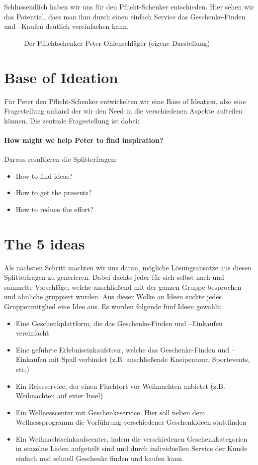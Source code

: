 \documentclass[12pt,ngerman, fleqn]{book} %
\begin{document}
Schlussendlich haben wir uns für den Pflicht-Schenker entschieden. Hier sehen wir das Potential, dass man ihm durch einen einfach Service das Geschenke-Finden und –Kaufen deutlich vereinfachen kann.

\begin{figure}[ht]
    \centering
    \caption{Der Pflichtschenker Peter Ohlenschläger (eigene Darstellung)}
    \label{fig:peter}
\end{figure}

\section{Base of Ideation}
Für Peter den Pflicht-Schenker entwickelten wir eine Base of Ideation, also eine Fragestellung anhand der wir den Need in die verschiedenen Aspekte aufteilen können. Die zentrale Fragestellung ist dabei:

\paragraph{How might we help Peter to find inspiration?}

Daraus resultieren die Splitterfragen:
\begin{itemize}
    \item How to find ideas?
    \item How to get the presents?
    \item How to reduce the effort?
\end{itemize}

\section{The 5 ideas}
Als nächsten Schritt machten wir uns daran, mögliche Lösungsansätze aus diesen Splitterfragen zu generieren. Dabei dachte jeder für sich selbst nach und sammelte Vorschläge, welche anschließend mit der ganzen Gruppe besprochen und ähnliche gruppiert wurden. Aus dieser Wolke an Ideen suchte jedes Gruppenmitglied eine Idee aus. Es wurden folgende fünf Ideen gewählt:

\begin{itemize}
    \item Eine Geschenkplattform, die das Geschenke-Finden und –Einkaufen vereinfacht
    \item Eine geführte Erlebniseinkaufstour, welche das Geschenke-Finden und –Einkaufen mit Spaß verbindet (z.B. anschließende Kneipentour, Sportevents, etc.)
    \item Ein Reiseservice, der einen Fluchtort vor Weihnachten anbietet (z.B. Weihnachten auf einer Insel)
    \item Ein Wellnesscenter mit Geschenkeservice. Hier soll neben dem Wellnessprogramm die Vorführung verschiedener Geschenkideen stattfinden
    \item Ein Weihnachtseinkaufscenter, indem die verschiedenen Geschenkkategorien in einzelne Läden aufgeteilt sind und durch individuellen Service der Kunde einfach und schnell Geschenke finden und kaufen kann.\\
\end{itemize}
\end{document}
